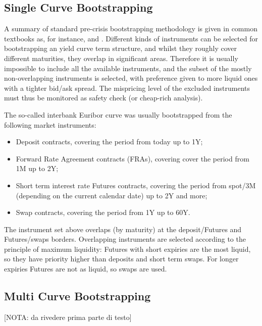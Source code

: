 \documentclass[11pt,reqno]{amsart}
\begin{document}
\subsection{Single Curve Bootstrapping}
A summary of standard pre-crisis bootstrapping methodology is given in common textbooks as, for instance, \cite{Hul08} and \cite{Reb1998}.
Different kinds of instruments can be selected for bootstrapping an yield curve term structure, and whilst they roughly cover different maturities, they overlap in significant areas. Therefore it is usually impossible to include all the available instruments, and the subset of the mostly non-overlapping instruments is selected, with preference given to more liquid ones with a tighter bid/ask spread. The mispricing level of the excluded instruments must thus be monitored as safety check (or cheap-rich analysis).
\par
The so-called interbank Euribor curve was usually bootstrapped from the following market instruments:
\begin{itemize}
\item Deposit contracts, covering the period from today up to 1Y;
\item Forward Rate Agreement contracts (FRAs), covering cover the period from 1M up to 2Y;
\item Short term interest rate Futures contracts, covering the period from spot/3M (depending on the current calendar date) up to 2Y and more;
\item Swap contracts, covering the period from 1Y up to 60Y.
\end{itemize}
The instrument set above overlaps (by maturity) at the deposit/Futures and Futures/swaps borders. Overlapping instruments are selected according to the principle of maximum liquidity: Futures with short expiries are the most liquid, so they have priority higher than deposits and short term swaps. For longer expiries Futures are not as liquid, so swaps are used.

\subsection{Multi Curve Bootstrapping}
[NOTA: da rivedere prima parte di testo]
\end{document}
